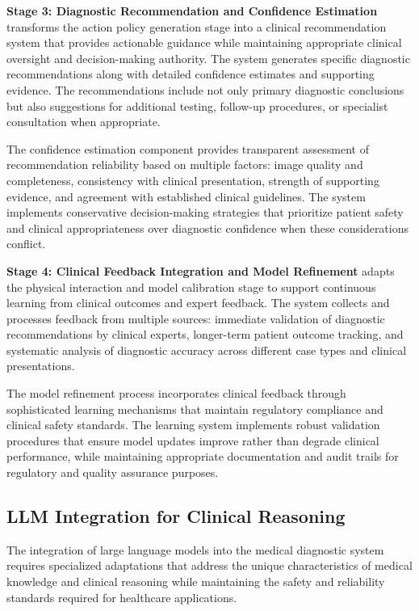 \textbf{Stage 3: Diagnostic Recommendation and Confidence Estimation} transforms the action policy generation stage into a clinical recommendation system that provides actionable guidance while maintaining appropriate clinical oversight and decision-making authority. The system generates specific diagnostic recommendations along with detailed confidence estimates and supporting evidence. The recommendations include not only primary diagnostic conclusions but also suggestions for additional testing, follow-up procedures, or specialist consultation when appropriate.

The confidence estimation component provides transparent assessment of recommendation reliability based on multiple factors: image quality and completeness, consistency with clinical presentation, strength of supporting evidence, and agreement with established clinical guidelines. The system implements conservative decision-making strategies that prioritize patient safety and clinical appropriateness over diagnostic confidence when these considerations conflict.

\textbf{Stage 4: Clinical Feedback Integration and Model Refinement} adapts the physical interaction and model calibration stage to support continuous learning from clinical outcomes and expert feedback. The system collects and processes feedback from multiple sources: immediate validation of diagnostic recommendations by clinical experts, longer-term patient outcome tracking, and systematic analysis of diagnostic accuracy across different case types and clinical presentations.

The model refinement process incorporates clinical feedback through sophisticated learning mechanisms that maintain regulatory compliance and clinical safety standards. The learning system implements robust validation procedures that ensure model updates improve rather than degrade clinical performance, while maintaining appropriate documentation and audit trails for regulatory and quality assurance purposes.

\subsection{LLM Integration for Clinical Reasoning}

The integration of large language models into the medical diagnostic system requires specialized adaptations that address the unique characteristics of medical knowledge and clinical reasoning while maintaining the safety and reliability standards required for healthcare applications.

